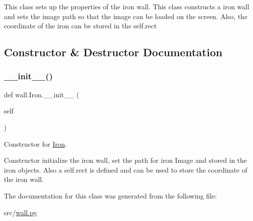 This class sets up the properties of the iron wall. This class constructs a iron wall and sets the image path so that the image can be loaded on the screen. Also, the coordinate of the iron can be stored in the self.\+rect 

\subsection{Constructor \& Destructor Documentation}
\mbox{\label{classwall_1_1_iron_a2adf26bdf967f38cf9793cf290f61615}} 
\subsubsection{\texorpdfstring{\_\_init\_\_()}{\_\_init\_\_()}}
{\footnotesize\ttfamily def wall.\+Iron.\+\_\+\+\_\+init\+\_\+\+\_\+ (\begin{DoxyParamCaption}\item[{}]{self }\end{DoxyParamCaption})}



Constructor for \mbox{\hyperlink{classwall_1_1_iron}{Iron}}. 

Constructor initialize the iron wall, set the path for iron Image and stored in the iron objects. Also a self.\+rect is defined and can be used to store the coordinate of the iron wall. 

The documentation for this class was generated from the following file\+:\begin{DoxyCompactItemize}
\item 
src/\mbox{\hyperlink{wall_8py}{wall.\+py}}\end{DoxyCompactItemize}
